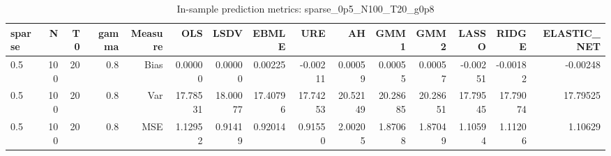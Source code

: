 \begin{table}[!htbp]\centering
\caption{In-sample prediction metrics: sparse_0p5_N100_T20_g0p8}
\label{tab:table2_sparse_0p5_N100_T20_g0p8}
\begin{tabular}{lrrrrrrrrrrrrrr}
\hline
sparse & N & T0 & gamma & Measure & OLS & LSDV & EBMLE & URE & AH & GMM1 & GMM2 & LASSO & RIDGE & ELASTIC_NET \\
\hline
0.5 & 100 & 20 & 0.8 & Bias & 0.00000 & 0.00000 & 0.00225 & -0.00211 & 0.00059 & 0.00055 & 0.00057 & -0.00251 & -0.00182 & -0.00248 \\
0.5 & 100 & 20 & 0.8 & Var & 17.78531 & 18.00077 & 17.40796 & 17.74253 & 20.52149 & 20.28685 & 20.28651 & 17.79545 & 17.79074 & 17.79525 \\
0.5 & 100 & 20 & 0.8 & MSE & 1.12952 & 0.91419 & 0.92014 & 0.91550 & 2.00205 & 1.87068 & 1.87049 & 1.10594 & 1.11206 & 1.10629 \\
\hline
\end{tabular}
\end{table}

